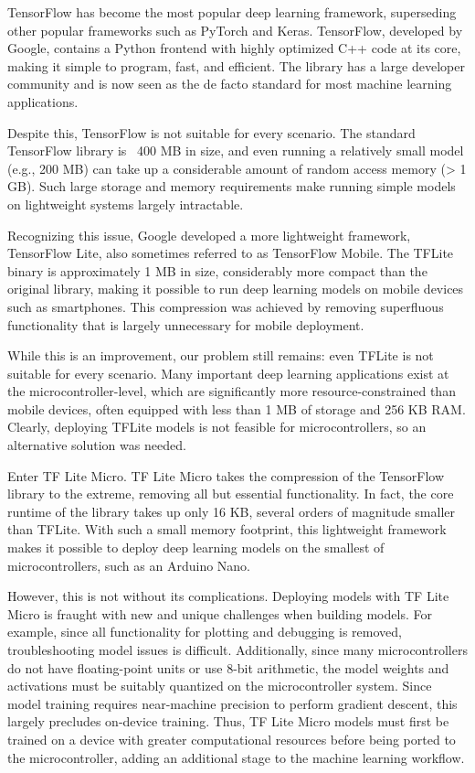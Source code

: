 TensorFlow has become the most popular deep learning framework, superseding other popular frameworks such as PyTorch and Keras. TensorFlow, developed by Google, contains a Python frontend with highly optimized C++ code at its core, making it simple to program, fast, and efficient. The library has a large developer community and is now seen as the de facto standard for most machine learning applications.

Despite this, TensorFlow is not suitable for every scenario. The standard TensorFlow library is ~400 MB in size, and even running a relatively small model (e.g., 200 MB) can take up a considerable amount of random access memory (> 1 GB). Such large storage and memory requirements make running simple models on lightweight systems largely intractable.

Recognizing this issue, Google developed a more lightweight framework, TensorFlow Lite, also sometimes referred to as TensorFlow Mobile. The TFLite binary is approximately 1 MB in size, considerably more compact than the original library, making it possible to run deep learning models on mobile devices such as smartphones. This compression was achieved by removing superfluous functionality that is largely unnecessary for mobile deployment. 

While this is an improvement, our problem still remains: even TFLite is not suitable for every scenario. Many important deep learning applications exist at the microcontroller-level, which are significantly more resource-constrained than mobile devices, often equipped with less than 1 MB of storage and 256 KB RAM. Clearly, deploying TFLite models is not feasible for microcontrollers, so an alternative solution was needed.

Enter TF Lite Micro. TF Lite Micro takes the compression of the TensorFlow library to the extreme, removing all but essential functionality. In fact, the core runtime of the library takes up only 16 KB, several orders of magnitude smaller than TFLite. With such a small memory footprint, this lightweight framework makes it possible to deploy deep learning models on the smallest of microcontrollers, such as an Arduino Nano.

However,  this is not without its complications.  Deploying models with TF Lite Micro is fraught with new and unique challenges when building models. For example, since all functionality for plotting and debugging is removed, troubleshooting model issues is difficult. Additionally, since many microcontrollers do not have floating-point units or use 8-bit arithmetic, the model weights and activations must be suitably quantized on the microcontroller system. Since model training requires near-machine precision to perform gradient descent, this largely precludes on-device training. Thus, TF Lite Micro models must first be trained on a device with greater computational resources before being ported to the microcontroller, adding an additional stage to the machine learning workflow. 

